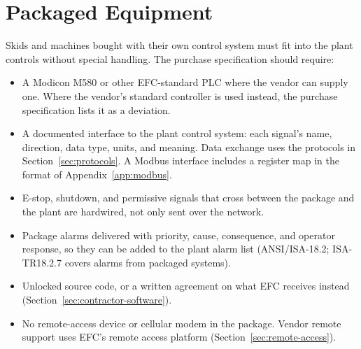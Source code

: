 \section[Packaged Equipment]{Packaged Equipment \newmark}\label{sec:packaged-equipment}
Skids and machines bought with their own control system must fit into the plant controls without special handling. The purchase specification should require:
\begin{itemize}[itemsep=1pt]
  \item A Modicon M580 or other EFC-standard PLC where the vendor can supply one. Where the vendor's standard controller is used instead, the purchase specification lists it as a deviation.
  \item A documented interface to the plant control system: each signal's name, direction, data type, units, and meaning. Data exchange uses the protocols in Section~\ref{sec:protocols}. A Modbus interface includes a register map in the format of Appendix~\ref{app:modbus}.
  \item E-stop, shutdown, and permissive signals that cross between the package and the plant are hardwired, not only sent over the network.
  \item Package alarms delivered with priority, cause, consequence, and operator response, so they can be added to the plant alarm list (ANSI/ISA-18.2; ISA-TR18.2.7 covers alarms from packaged systems).
  \item Unlocked source code, or a written agreement on what EFC receives instead (Section~\ref{sec:contractor-software}).
  \item No remote-access device or cellular modem in the package. Vendor remote support uses EFC's remote access platform (Section~\ref{sec:remote-access}).
\end{itemize}

